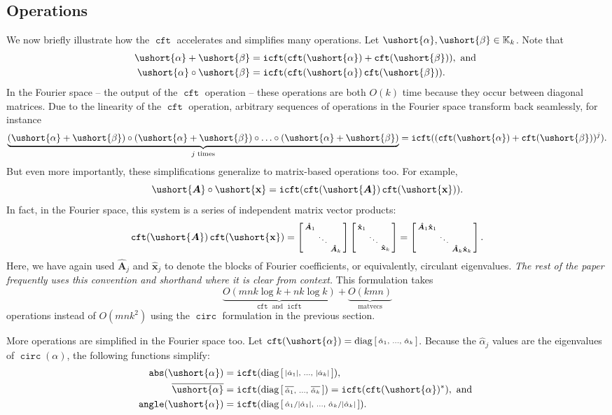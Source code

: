 \documentclass[1p,authoryear,letterpaper]{elsarticle}
\DeclareMathOperator{\tcirc}{\texttt{circ}}
\DeclareMathOperator{\tabs}{\texttt{abs}}
\providecommand{\KK}{\mathbb{K}}
\newcommand{\conj}[1]{\overline{#1}}
\providecommand{\sbmat}[1]{\left[\begin{smallmatrix} #1 \end{smallmatrix}\right]}
\providecommand{\mat}{\boldsymbol}
\renewcommand{\vec}{\mathbf}
\providecommand{\mhat}[1]{\ensuremath{\mat{\hat{#1}}}}
\providecommand{\vhat}[1]{\ensuremath{\vec{\hat{#1}}}}
\providecommand{\mAhat}{\mhat{A}}
\providecommand{\vxhat}{\vhat{x}}
\DeclareMathOperator{\fft}{\texttt{cft}}
\DeclareMathOperator{\ifft}{\texttt{icft}}
\newcommand{\cel}[1]{\ushort{#1}}
\newcommand{\celm}[1]{\cel{\mat{#1}}}
\newcommand{\celv}[1]{\cel{\vec{#1}}}
\newcommand{\calpha}{\ensuremath{\cel{\alpha}}}
\newcommand{\cbeta}{\ensuremath{\cel{\beta}}}
\newcommand{\cvx}{\ensuremath{\celv{x}}}
\providecommand{\cmA}{\ensuremath{\celm{A}}}
\DeclareMathOperator{\tangle}{\texttt{angle}}
\begin{document}
\subsection{Operations}
We now briefly illustrate how the $\fft$ accelerates
and simplifies many operations.  Let $\calpha, \cbeta \in \KK_k$.
Note that
\[
\begin{aligned}
 \calpha + \cbeta & = \ifft( \fft(\calpha) + \fft(\cbeta) ), \text{ and } \\
 \calpha \circ \cbeta & = \ifft( \fft(\calpha) \fft(\cbeta) ). \\
\end{aligned}
\]
In the Fourier space -- the output of the $\fft$ operation --
these operations are both $O(k)$ time because they occur between diagonal
matrices.
Due to the linearity of the $\fft$ operation, arbitrary sequences of
operations in the Fourier space
transform back seamlessly, for instance
\[ \underbrace{(\calpha + \cbeta) \circ (\calpha + \cbeta)  \circ \ldots \circ (\calpha + \cbeta) }_{j \text{ times}} = \ifft( (\fft(\calpha) + \fft(\cbeta))^j ). \]
But even more importantly, these simplifications generalize to matrix-based
operations too.  For example,
\[ \cmA \circ \cvx = \ifft( \fft(\cmA) \fft(\cvx) ). \]
In fact, in the Fourier space, this system is a series of
independent matrix vector products:
\[ \fft(\cmA) \fft(\cvx) =
  \sbmat{\mAhat_1 \\ & \ddots \\ & & \mAhat_k}
  \sbmat{\vxhat_1 \\ & \ddots \\ & & \vxhat_k}
  = \sbmat{\mAhat_1 \vxhat_1 \\ & \ddots \\ & & \mAhat_k \vxhat_k} .
\]
Here, we have again used $\mAhat_j$ and $\vxhat_j$ to denote the
blocks of Fourier coefficients, or equivalently, circulant eigenvalues.
\emph{The rest of the paper frequently uses this convention and
shorthand where it is clear from context.}
This formulation takes
\[ \underbrace{O(m n k \log k + n k \log k)}_{\fft \text{ and } \ifft} + \underbrace{O(k m n)}_{\text{matvecs}} \]
operations instead of $O(mnk^2)$ using the $\tcirc$ formulation
in the previous section.

More operations are simplified in the Fourier space too.
Let $\fft(\calpha) = \diag\sbmat{\hat{\alpha}_1, & \ldots, & \hat{\alpha}_k}$.
Because the $\hat{\alpha}_j$ values are the eigenvalues of $\tcirc(\alpha)$, the following functions simplify:
\[
\begin{aligned}
\tabs(\calpha) & = \ifft( \diag\sbmat{|\hat{\alpha}_1|, & \ldots,  & |\hat{\alpha}_k|}), \\
\conj{\calpha} & = \ifft( \diag\sbmat{\conj{\hat{\alpha}_1}, & \ldots,  & \conj{\hat{\alpha}_k}}) = \ifft(\fft(\calpha)^*), \text{ and } \\
\tangle(\calpha) & = \ifft( \diag\sbmat{\hat{\alpha}_1/|\hat{\alpha}_1|, & \ldots, & \hat{\alpha}_k/|\hat{\alpha}_k| } ).
\end{aligned}
\]
\end{document}
